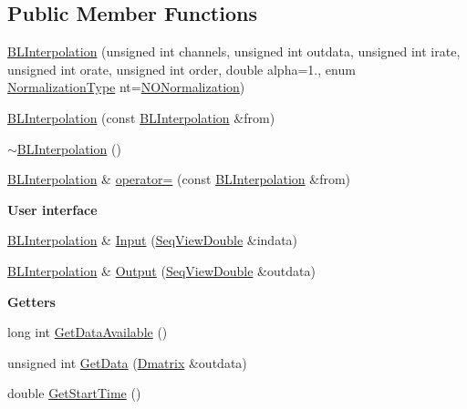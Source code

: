 \subsection*{Public Member Functions}
\begin{DoxyCompactItemize}
\item 
\hyperlink{classtsa_1_1_b_l_interpolation_aef84f84620a59efee8d1e2bb1cffd46d}{B\+L\+Interpolation} (unsigned int channels, unsigned int outdata, unsigned int irate, unsigned int orate, unsigned int order, double alpha=1., enum \hyperlink{classtsa_1_1_b_l_interpolation_ae11719d30e353da11f076289b87c7b1d}{Normalization\+Type} nt=\hyperlink{classtsa_1_1_b_l_interpolation_ae11719d30e353da11f076289b87c7b1da2eb150e3b7e6ed1aff3dadd9dae02b5b}{N\+O\+Normalization})
\item 
\hyperlink{classtsa_1_1_b_l_interpolation_ace4ab80e2c9f5147685bd22d5ee5841e}{B\+L\+Interpolation} (const \hyperlink{classtsa_1_1_b_l_interpolation}{B\+L\+Interpolation} \&from)
\item 
\hyperlink{classtsa_1_1_b_l_interpolation_a67cd882b93c7643cd0fdce08b7fa876f}{$\sim$\+B\+L\+Interpolation} ()
\item 
\hyperlink{classtsa_1_1_b_l_interpolation}{B\+L\+Interpolation} \& \hyperlink{classtsa_1_1_b_l_interpolation_a71b2bc1e0a68abe528d5c753b4a5c1c1}{operator=} (const \hyperlink{classtsa_1_1_b_l_interpolation}{B\+L\+Interpolation} \&from)
\end{DoxyCompactItemize}
\begin{Indent}\textbf{ User interface}\par
\begin{DoxyCompactItemize}
\item 
\hyperlink{classtsa_1_1_b_l_interpolation}{B\+L\+Interpolation} \& \hyperlink{classtsa_1_1_b_l_interpolation_ad4ce3e5cb5bc89e8de11a0dc1d54121e}{Input} (\hyperlink{namespacetsa_ac599574bcc094eda25613724b8f3ca9e}{Seq\+View\+Double} \&indata)
\item 
\hyperlink{classtsa_1_1_b_l_interpolation}{B\+L\+Interpolation} \& \hyperlink{classtsa_1_1_b_l_interpolation_aa67c8de249d447dea6bb6b9d353139bc}{Output} (\hyperlink{namespacetsa_ac599574bcc094eda25613724b8f3ca9e}{Seq\+View\+Double} \&outdata)
\end{DoxyCompactItemize}
\end{Indent}
\begin{Indent}\textbf{ Getters}\par
\begin{DoxyCompactItemize}
\item 
long int \hyperlink{classtsa_1_1_b_l_interpolation_a10f95a5ac0e7cc6981d30ed420404a3d}{Get\+Data\+Available} ()
\item 
unsigned int \hyperlink{classtsa_1_1_b_l_interpolation_a30ed4268c0691edf852ddb3c2ce541c7}{Get\+Data} (\hyperlink{namespacetsa_ad260cd21c1891c4ed391fe788569aba4}{Dmatrix} \&outdata)
\item 
double \hyperlink{classtsa_1_1_b_l_interpolation_a4fa7c4bfb9e12a3eb6767fc6b128093c}{Get\+Start\+Time} ()
\end{DoxyCompactItemize}
\end{Indent}
